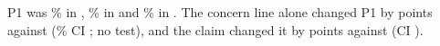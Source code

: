 P1 was \wtthHaikuPOneClaimPct\% in , \wtthHaikuPOneConcernPct\% in  and \wtthHaikuPOneNonePct\% in .
The concern line alone changed P1 by \wtthHaikuDescPOneConcernMinusNoneDelta{} points against  (\wtthProtocolLevel\% CI \wtthHaikuDescPOneConcernMinusNoneCI; no test), and the claim changed it by \wtthHaikuDescPOneClaimMinusConcernDelta{} points against  (CI \wtthHaikuDescPOneClaimMinusConcernCI).
